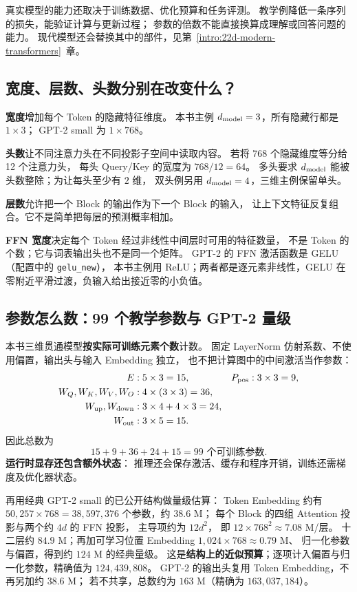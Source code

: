 真实模型的能力还取决于训练数据、优化预算和任务评测。
教学例降低一条序列的损失，能验证计算与更新过程；
参数的倍数不能直接换算成理解或回答问题的能力。
现代模型还会替换其中的部件，见第~\ref*{intro:22d-modern-transformers}~章。

\subsection{宽度、层数、头数分别在改变什么？}

\textbf{宽度}增加每个 Token 的隐藏特征维度。
本书主例 $d_{\rm model}=3$，所有隐藏行都是 $1\times3$；
GPT-2 small 为 $1\times768$。

\textbf{头数}让不同注意力头在不同投影子空间中读取内容。
若将 768 个隐藏维度等分给 12 个注意力头，
每头 Query/Key 的宽度为 $768/12=64$。
多头要求 $d_{\rm model}$ 能被头数整除；为让每头至少有 $2$ 维，
双头例另用 $d_{\rm model}=4$，三维主例保留单头。

\textbf{层数}允许把一个 Block 的输出作为下一个 Block 的输入，
让上下文特征反复组合。它不是简单把每层的预测概率相加。

\textbf{FFN 宽度}决定每个 Token 经过非线性中间层时可用的特征数量，
不是 Token 的个数；它与词表输出头也不是同一个矩阵。
GPT-2 的 FFN 激活函数是 GELU（配置中的 \texttt{gelu\_new}），
本书主例用 ReLU；两者都是逐元素非线性，GELU 在零附近平滑过渡，负输入给出接近零的小负值。

\subsection{参数怎么数：99 个教学参数与 GPT-2 量级}

本书三维贯通模型\textbf{按实际可训练元素个数}计数。
固定 LayerNorm 仿射系数、不使用偏置，输出头与输入 Embedding 独立，
也不把计算图中的中间激活当作参数：
\[
\begin{aligned}
E &: 5\times3=15, & P_{\rm pos} &:3\times3=9,\\
W_Q,W_K,W_V,W_O &:4\times(3\times3)=36,\\
W_{\rm up},W_{\rm down} &:3\times4+4\times3=24,\\
W_{\rm out} &:3\times5=15.
\end{aligned}
\]
因此总数为
\begin{equation}
\boxed{15+9+36+24+15=99\text{ 个可训练参数}.}
\label{eq:toy-99-parameters}
\end{equation}
\textbf{运行时显存还包含额外状态}：
推理还会保存激活、缓存和程序开销，训练还需梯度及优化器状态。

再用经典 GPT-2 small 的已公开结构做量级估算：
Token Embedding 约有
$50{,}257\times768=38{,}597{,}376$ 个参数，约 $38.6$ M；
每个 Block 的四组 Attention 投影与两个约 $4d$ 的 FFN 投影，
主导项约为 $12d^2$，
即 $12\times768^2\approx7.08$ M/层。
十二层约 $84.9$ M；再加可学习位置 Embedding
$1{,}024\times768\approx0.79$ M、
归一化参数与偏置，得到约 $124$ M 的经典量级。
这是\textbf{结构上的近似预算}；逐项计入偏置与归一化参数，精确值为 $124{,}439{,}808$。
GPT-2 的输出头复用 Token Embedding，不再另加约 $38.6$ M；
若不共享，总数约为 $163$ M（精确为 $163{,}037{,}184$）。

